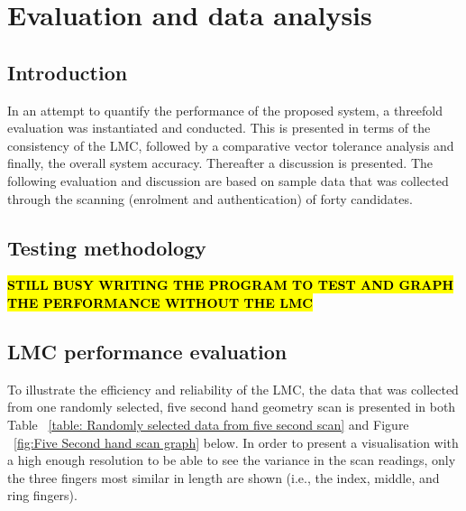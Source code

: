\chapter{Evaluation and data analysis}


\section{Introduction}

In an attempt to quantify the performance of the proposed system, a threefold evaluation was instantiated and conducted. This is presented in terms of the consistency of the LMC, followed by a comparative vector tolerance analysis and finally, the overall system accuracy. Thereafter a discussion is presented. The following evaluation and discussion are based on sample data that was collected through the scanning (enrolment and authentication) of forty candidates.

\section{Testing methodology}

\textcolor{yellow}{\textbf{\hl{STILL BUSY WRITING THE PROGRAM TO TEST AND GRAPH THE PERFORMANCE WITHOUT THE LMC}}}

\section{LMC performance evaluation}

To illustrate the efficiency and reliability of the LMC, the data that was collected from one randomly selected, five second hand geometry scan is presented in both Table ~\ref{table: Randomly selected data from five second scan} and Figure ~\ref{fig:Five Second hand scan graph} below. 
In order to present a visualisation with a high enough resolution to be able to see the variance in the scan readings, only the three fingers most similar in length are shown (i.e., the index, middle, and ring fingers). 

    
